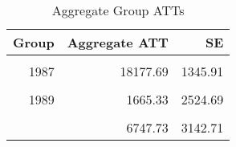 \begin{table}[!h]

\caption{\label{tab:CSEst}Aggregate Group ATTs}
\centering
\begin{tabular}[t]{rrr}
\toprule
Group & Aggregate ATT & SE\\
\midrule
\cellcolor{gray!6}{1977} & \cellcolor{gray!6}{-6969.74} & \cellcolor{gray!6}{3139.42}\\
1987 & 18177.69 & 1345.91\\
\cellcolor{gray!6}{1988} & \cellcolor{gray!6}{2460.28} & \cellcolor{gray!6}{1543.74}\\
1989 & 1665.33 & 2524.69\\
\cellcolor{gray!6}{1990} & \cellcolor{gray!6}{2383.97} & \cellcolor{gray!6}{2455.67}\\
\addlinespace
1991 & 6747.73 & 3142.71\\
\bottomrule
\end{tabular}
\end{table}
